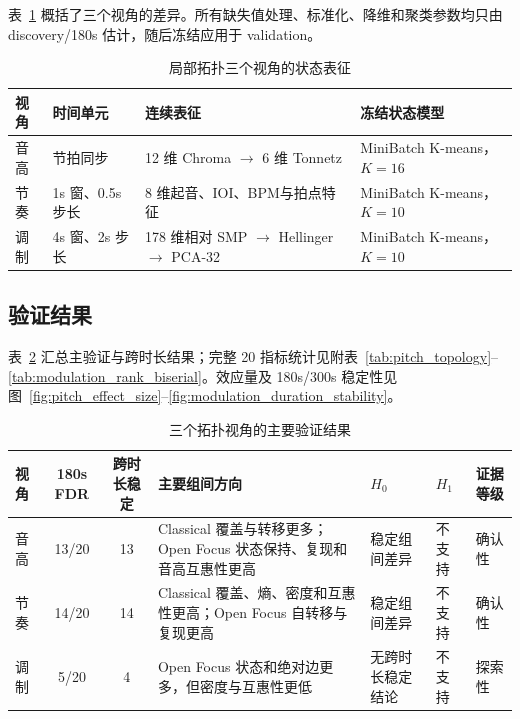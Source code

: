 \documentclass{article}
\begin{document}
表~\ref{tab:local_view_representations} 概括了三个视角的差异。所有缺失值处理、标准化、降维和聚类参数均只由 discovery/180s 估计，随后冻结应用于 validation。

\begin{table}[htbp]
\centering
\setlength{\tabcolsep}{4pt}
\caption{局部拓扑三个视角的状态表征}
\label{tab:local_view_representations}
\begin{tabular}{llll}
\toprule
视角 & 时间单元 & 连续表征 & 冻结状态模型 \\
\midrule
音高 & 节拍同步 & 12 维 Chroma $\rightarrow$ 6 维 Tonnetz & MiniBatch K-means，$K=16$ \\
节奏 & 1s 窗、0.5s 步长 & 8 维起音、IOI、BPM与拍点特征 & MiniBatch K-means，$K=10$ \\
调制 & 4s 窗、2s 步长 & 178 维相对 SMP $\rightarrow$ Hellinger $\rightarrow$ PCA-32 & MiniBatch K-means，$K=10$ \\
\bottomrule
\end{tabular}
\end{table}

\subsection{验证结果}

表~\ref{tab:local_view_summary} 汇总主验证与跨时长结果；完整 20 指标统计见附表~\ref{tab:pitch_topology}--\ref{tab:modulation_rank_biserial}。效应量及 180s/300s 稳定性见图~\ref{fig:pitch_effect_size}--\ref{fig:modulation_duration_stability}。

\begin{table}[htbp]
\centering
\setlength{\tabcolsep}{3pt}
\caption{三个拓扑视角的主要验证结果}
\label{tab:local_view_summary}
\begin{tabular}{lccp{5.2cm}p{2cm}p{1.4cm}l}
\toprule
视角 & 180s FDR & 跨时长稳定 & 主要组间方向 & $H_0$ & $H_1$ & 证据等级 \\
\midrule
音高 & 13/20 & 13 & Classical 覆盖与转移更多；Open Focus 状态保持、复现和音高互惠性更高 & 稳定组间差异 & 不支持 & 确认性 \\
节奏 & 14/20 & 14 & Classical 覆盖、熵、密度和互惠性更高；Open Focus 自转移与复现更高 & 稳定组间差异 & 不支持 & 确认性 \\
调制 & 5/20 & 4 & Open Focus 状态和绝对边更多，但密度与互惠性更低 & 无跨时长稳定结论 & 不支持 & 探索性 \\
\bottomrule
\end{tabular}
\end{table}
\end{document}
